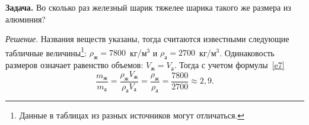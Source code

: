 \documentclass[main.tex]{subfiles}
\begin{document}
\medskip

\noindent\textbf{Задача.} Во сколько раз железный шарик тяжелее шарика такого же размера из алюминия?

\smallskip

\noindent\emph{Решение}. Названия веществ указаны, тогда считаются известными следующие табличные величины\footnote{Данные в таблицах из разных источников могут отличаться.}: $\rho_\text{ж}=7800$~кг$/$м$^3$ и $\rho_\text{а}=2700$~кг$/$м$^3$. Одинаковость размеров означает равенство объемов: $V_\text{ж}=V_\text{а}$. Тогда с учетом формулы~\eqref{e7}
\[
\dfrac{m_\text{ж}}{m_\text{а}}=\dfrac{\rho_\text{ж}V_\text{ж}}{\rho_\text{а}V_\text{а}}=\dfrac{\rho_\text{ж}}{\rho_\text{а}}=\dfrac{7800}{2700}\approx 2{,}9.
\]








 
\end{document}
